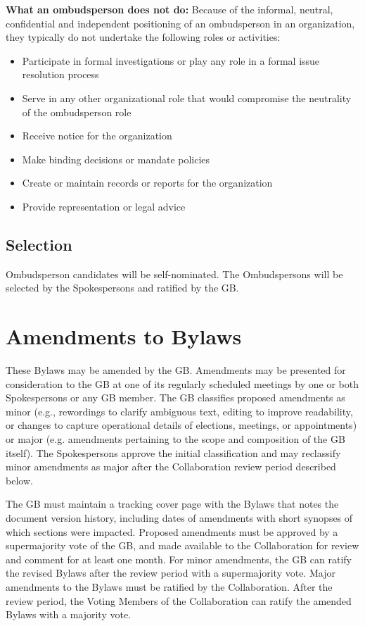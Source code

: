 \documentclass[12pt]{article}
\begin{document}
{\bf What an ombudsperson does not do:} Because of the informal, neutral, confidential and independent positioning of an ombudsperson
in an organization, they typically do not undertake the following roles or activities:
\begin{itemize}
\item Participate in formal investigations or play any role in a formal issue resolution process
\item Serve in any other organizational role that would compromise the neutrality of the
ombudsperson role
\item Receive notice for the organization
\item Make binding decisions or mandate policies
\item Create or maintain records or reports for the organization
\item Provide representation or legal advice

\end{itemize}

\subsection{Selection}
Ombudsperson candidates will be self-nominated.  The Ombudspersons will be selected by the Spokespersons and ratified by the GB.


\section{Amendments to Bylaws}
\label{sec:amend}
These Bylaws may be amended by the GB. Amendments may be presented for consideration to the GB at one of its regularly scheduled meetings by one or both Spokespersons or any GB member.
The GB  classifies proposed amendments as minor (e.g., rewordings to clarify ambiguous text, editing to improve readability, or changes to capture operational details of elections, meetings, or appointments) or major (e.g. amendments pertaining to the scope and composition of the GB itself).  The Spokespersons approve the initial classification and may reclassify minor amendments as major after the Collaboration review period described below.

The GB must  maintain a tracking cover page with the Bylaws that notes the document version history, including dates of amendments with short synopses of which sections were impacted.  Proposed amendments must be approved by a supermajority vote of the GB, and made available to the Collaboration for review and comment for at least one month.  
For minor amendments, the GB can  ratify the revised Bylaws after the review period with a supermajority vote. Major amendments to the Bylaws must be ratified by the Collaboration. After the review period, the Voting Members of the Collaboration can  ratify the amended Bylaws with a majority vote.
\end{document}
